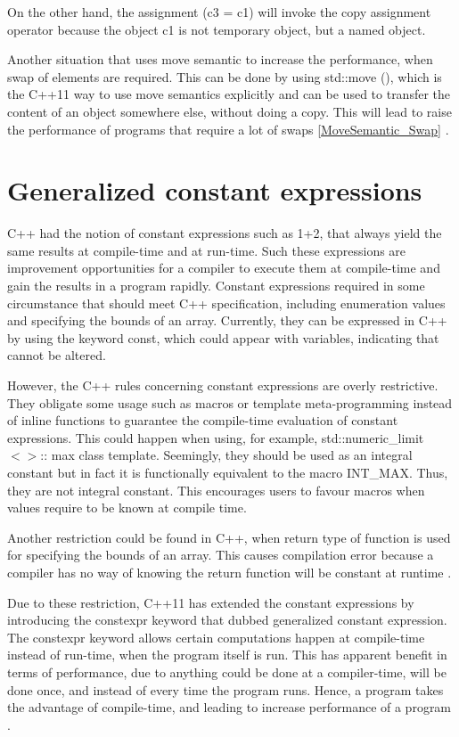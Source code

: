 \documentclass[11pt]{report}
\begin{document}
On the other hand, the assignment (c3 = c1) will invoke the copy assignment operator because the object c1 is not temporary object, but a named object.


Another situation that uses move semantic to increase the performance, when swap of elements are required. This can be done by using std::move (), which is the C++11 way to use move semantics explicitly and can be used to transfer the content of an object somewhere else, without doing a copy. This will lead to raise the performance of programs that require a lot of swaps \ref{MoveSemantic_Swap} \cite{Gregorie:professionalcpp}.


\section{Generalized constant expressions}
\label{section: Generalized constant expressions}
C++ had the notion of constant expressions such as 1+2, that always yield the same results at compile-time and at run-time. Such these expressions are improvement opportunities for a compiler to execute them at compile-time and gain the results in a program rapidly. Constant expressions required in some circumstance that should meet C++ specification, including enumeration values and specifying the bounds of an array. Currently, they can be expressed in C++ by using the keyword const, which could appear with variables, indicating that cannot be altered.


However, the C++ rules concerning constant expressions are overly restrictive. They obligate some usage such as macros or template meta-programming instead of inline functions to guarantee the compile-time evaluation of constant expressions. This could happen when using, for example, std::numeric\_limit$<>$:: max  class template.  Seemingly, they should be used as an integral constant but in fact it is functionally equivalent to the macro INT\_MAX. Thus, they are not integral constant. This encourages users to favour macros when values require to be known at compile time.


Another restriction could be found in C++, when return type of function is used for specifying the bounds of an array. This causes compilation error because a compiler has no way of knowing the return function will be constant at runtime \cite{Stroustrup:2012:Cpp11}. 


Due to these restriction, C++11 has extended the constant expressions by introducing the constexpr keyword that dubbed generalized constant expression. The constexpr keyword allows certain computations happen at compile-time instead of run-time, when the program itself is run.  This has apparent benefit in terms of performance, due to anything could be done at a compiler-time, will be done once, and instead of every time the program runs. Hence, a program takes the advantage of compile-time, and leading to increase performance of a program \cite{Williams:2012:CCA}.
\end{document}
